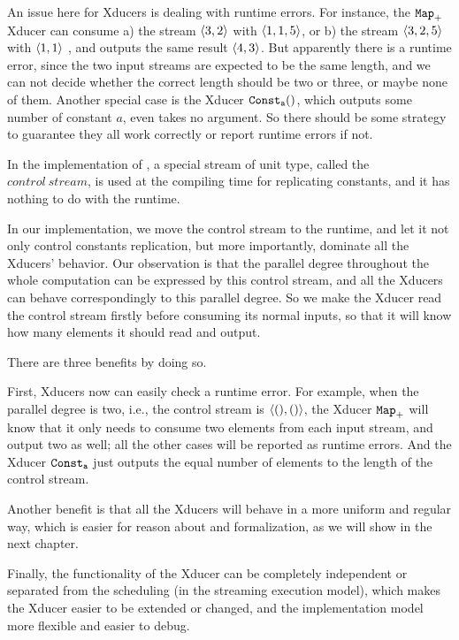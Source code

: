 An issue here for Xducers is dealing with runtime errors. 
For instance, the $\mathtt{Map}_{+}$ Xducer can consume a) the stream $\<3,2\'>$ with $\< 1,1,5\'>$, or b) the stream $\<3,2,5\'>$ with $\< 1,1\'>$ , and outputs the same result $\<4, 3\'>$. 
But apparently there is a runtime error, since the two input streams are expected to be the same length, and we can not decide whether the correct length should be two or three, or maybe none of them.
Another special case is the Xducer $\mathtt{Const_{a}()}$, which outputs some number of constant $a$, even takes no argument. 
So there should be some strategy to guarantee they all work correctly or report runtime errors if not.

In the implementation of \cite{Fphd}, a special stream of unit type, called the $control \ stream$, is used at the compiling time for replicating constants, and it has nothing to do with the runtime.

In our implementation, we move the control stream to the runtime, and let it not only control constants replication, but more importantly, dominate all the Xducers' behavior. 
Our observation is that the parallel degree throughout the whole computation can be expressed by this control stream, and all the Xducers can behave correspondingly to this parallel degree. 
So we make the Xducer read the control stream firstly before consuming its normal inputs, so that it will know how many elements it should read and output.

There are three benefits by doing so.

First, Xducers now can easily check a runtime error. 
For example, when the parallel degree is two, i.e., the control stream is $\< (),() \'>$, the Xducer $\mathtt{Map}_{+}$ will know that it only needs to consume two elements from each input stream, and output two as well; all the other cases will be reported as runtime errors.  
And the Xducer $\mathtt{Const_{a}}$ just outputs the equal number of elements to the length of the control stream.

Another benefit is that all the Xducers will behave in a more uniform and regular way, which is easier for reason about and formalization, as we will show in the next chapter.

Finally, the functionality of the Xducer can be completely independent or separated from the scheduling (in the streaming execution model),  which makes the Xducer easier to be extended or changed,
and the implementation model more flexible and easier to debug. 



